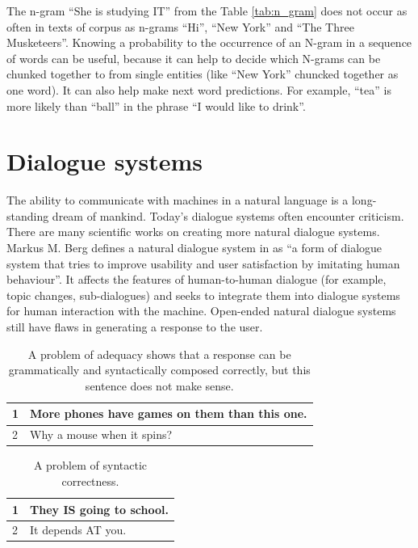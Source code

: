 The n-gram ``She is studying IT'' from the Table \ref{tab:n_gram} does not occur as often in texts of corpus as n-grams ``Hi'', ``New York'' and ``The Three Musketeers''. Knowing a probability to the occurrence of an N-gram in a sequence of words can be useful, because it can help to decide which N-grams can be chunked together to from single entities (like ``New York'' chuncked together as one word). It can also help make next word predictions. For example, ``tea'' is more likely than ``ball'' in the phrase ``I would like to drink''.

\section{Dialogue systems} 
The ability to communicate with machines in a natural language is a long-standing dream of mankind. Today's dialogue systems often encounter criticism. There are many scientific works on creating more natural dialogue systems. Markus M. Berg defines a natural dialogue system in \cite{berg2014modelling} as ``a form of dialogue system that tries to improve usability and user satisfaction by imitating human behaviour''. It affects the features of human-to-human dialogue (for example, topic changes, sub-dialogues) and seeks to integrate them into dialogue systems for human interaction with the machine. Open-ended natural dialogue systems still have flaws in generating a response to the user.

\begin{table}[ht]
\centering
 \begin{tabular}{|p{0.5cm}|p{8cm}|} 
 \hline
 1 & More phones have games on them than this one. \\
 \hline
 2 & Why a mouse when it spins? \\
 \hline
 \end{tabular}
 \caption{A problem of adequacy shows that a response can be grammatically and syntactically composed correctly, but this sentence does not make sense.}
\label{tab:adequacy_prob}
\end{table}

\begin{table}[ht]
\centering
 \begin{tabular}{|p{0.5cm}|p{8cm}|} 
 \hline
 1 & They IS going to school. \\ 
 \hline
 2 & It depends AT you. \\
 \hline
 \end{tabular}
 \caption{A problem of syntactic correctness.}
\label{tab:syntactic_corr_prob}
\end{table}

